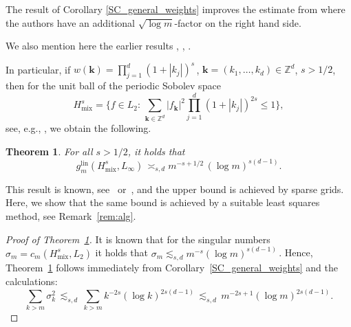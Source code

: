 \documentclass[a4paper,12pt]{amsart}
\newtheorem{theorem}{Theorem}
\theoremstyle{definition}
\theoremstyle{remark}
\newcommand{\bk}{\mathbf{k}}
\newcommand{\lin}{\ensuremath{\mathrm{lin}}}
\newcommand{\mix}{\ensuremath{\mathrm{mix}}}
\begin{document}
	The result of Corollary \ref{SC_general_weights} improves the estimate from \cite[Thm. 6.2]{PU} where the authors have an additional $\sqrt{\log m}$-factor on the right hand side. 

We also mention here the earlier results \cite[Theorem~4.11]{Kam19},  
\cite{Kam_Vol19}, \cite{Zeng_Kritzer_Hickernell2009}.


In particular, if $w(\bk) =  \prod_{j=1}^d (1+  |k_j|)^{s}$\,, $\bk=(k_1,\dots,k_d)\in \mathbb{Z}^d $,  $s > 1/2$, then for the unit ball of the periodic Sobolev space 
\begin{equation*}%
	H^{s}_{\mix} = \Big\{ f\in L_2 \colon \, 
	\sum_{ \bk\in \mathbb{Z}^d }  | f_\bk |^2  \prod_{j=1}^d (1+  |k_j|)^{2s}  \le 1 \Big\},
\end{equation*}
see, e.g., \cite{KSU}, 
we obtain the following. 


\begin{theorem}\label{Th_Sobolev_type_asymptotic} 
	For all
	$s>1/2$, it holds that %
	$$
	g_
	{m}^{\lin}( 
	H^{s}_{\mix}, L_{\infty}) 
	\,\asymp_{s, d} 
        m^{-s+1/2}\,   \left(  \log m \right)^{s(d-1)}.
	$$	
\end{theorem}

\medskip

This result is known, see~\cite{Tem93} or~\cite[Theorem~5.4.1]{DTU18}, 
and the upper bound is achieved by sparse grids. 
Here, we show that the same bound is achieved 
by a suitable least squares method, 
see Remark~\ref{rem:alg}. 



\begin{proof}[Proof of Theorem~\ref{Th_Sobolev_type_asymptotic}]
It is known \cite{Bab,Mit} that for the singular numbers $\sigma_m = c_m(H^{s}_{\mix},  L_2)$ it 
 {holds that}
	$\sigma_m \lesssim_{s,d} m^{-s} (\log m)^{s(d-1)} \,$.
Hence, Theorem~\ref{Th_Sobolev_type_asymptotic} follows 
 immediately from 
Corollary~\ref{SC_general_weights}
   and the calculations:
$$
		\sum_{k
	>m}	\sigma_k^2
		\,\lesssim_{s,d}\,
		\sum_{k>m }  k^{-2s} (\log k)^{2s(d-1)}
		\,\lesssim_{s,d}\, m^{-2s+1}   \left(  \log m \right)^{2s(d-1)}.
$$
\end{proof}
\end{document}
